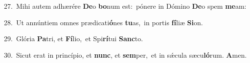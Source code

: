{\numbfont\textcolor{\numbcolor}{27.}}~Mihi autem adhærére \textbf{De}\-o \textbf{bo}\-num est:~\star pónere in Dómino \textbf{De}\-o spem \textbf{me}\-am:\par
{\numbfont\textcolor{\numbcolor}{28.}}~Ut annúntiem omnes prædicati\-\textbf{ó}\-nes \textbf{tu}\-as,~\star in portis \textbf{fí}\-liæ \textbf{Si}\-on.\par
{\numbfont\textcolor{\numbcolor}{29.}}~Glória \textbf{Pa}\-tri, et \textbf{Fí}\-lio,~\star et Spi\-\textbf{rí}\-tui \textbf{Sanc}\-to.\par
{\numbfont\textcolor{\numbcolor}{30.}}~Sicut erat in princípio, et \textbf{nunc}\-, et \textbf{sem}\-per,~\star et in sǽcula sæcu\-\textbf{ló}\-rum. \textbf{A}\-men.\par
